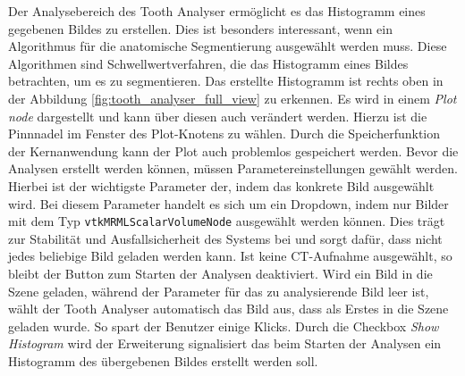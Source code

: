 Der Analysebereich des Tooth Analyser ermöglicht es das Histogramm eines
gegebenen Bildes zu erstellen. Dies ist besonders interessant, wenn ein
Algorithmus für die anatomische Segmentierung ausgewählt werden muss. Diese Algorithmen
sind Schwellwertverfahren, die das Histogramm eines Bildes betrachten, um es zu segmentieren.
Das erstellte Histogramm ist rechts oben in der Abbildung
\ref{fig:tooth_analyser_full_view} zu erkennen. Es wird in einem \textit{Plot
node} dargestellt und kann über diesen auch verändert werden. Hierzu ist die Pinnnadel
im Fenster des Plot-Knotens zu wählen. Durch die Speicherfunktion der
Kernanwendung kann der Plot auch problemlos gespeichert werden. Bevor die Analysen
erstellt werden können, müssen Parametereinstellungen gewählt werden. Hierbei ist
der wichtigste Parameter der, indem das konkrete Bild ausgewählt wird. Bei diesem
Parameter handelt es sich um ein Dropdown, indem nur Bilder mit dem Typ \texttt{vtkMRMLScalarVolumeNode}
ausgewählt werden können. Dies trägt zur Stabilität und Ausfallsicherheit des
Systems bei und sorgt dafür, dass nicht jedes beliebige Bild geladen werden kann.
Ist keine \ac{CT}-Aufnahme ausgewählt, so bleibt der Button zum Starten der
Analysen deaktiviert. Wird ein Bild in die Szene geladen, während der Parameter
für das zu analysierende Bild leer ist, wählt der Tooth Analyser automatisch das
Bild aus, dass als Erstes in die Szene geladen wurde. So spart der Benutzer einige
Klicks. Durch die Checkbox \textit{Show Histogram} wird der Erweiterung signalisiert
das beim Starten der Analysen ein Histogramm des übergebenen Bildes erstellt werden
soll.

